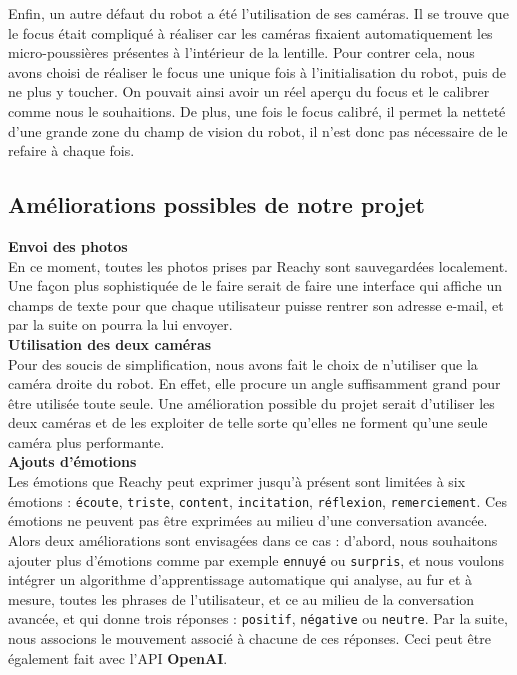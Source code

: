 \documentclass[a4paper,french]{article}
\begin{document}
Enfin, un autre défaut du robot a été l'utilisation de ses caméras. Il se trouve que le focus était compliqué à réaliser car les caméras fixaient automatiquement les micro-poussières présentes à l'intérieur de la lentille. Pour contrer cela, nous avons choisi de réaliser le focus une unique fois à l'initialisation du robot, puis de ne plus y toucher. On pouvait ainsi avoir un réel aperçu du focus et le calibrer comme nous le souhaitions. De plus, une fois le focus calibré, il permet la netteté d'une grande zone du champ de vision du robot, il n'est donc pas nécessaire de le refaire à chaque fois.

\subsection{Améliorations possibles de notre projet}
\textbf{Envoi des photos} \\ 

En ce moment, toutes les photos prises par Reachy sont sauvegardées localement. Une façon plus sophistiquée de le faire serait de faire une interface qui affiche un champs de texte pour que chaque utilisateur puisse rentrer son adresse e-mail, et par la suite on pourra la lui envoyer. \\

\textbf{Utilisation des deux caméras} \\

Pour des soucis de simplification, nous avons fait le choix de n'utiliser que la caméra droite du robot. En effet, elle procure un angle suffisamment grand pour être utilisée toute seule. Une amélioration possible du projet serait d'utiliser les deux caméras et de les exploiter de telle sorte qu'elles ne forment qu'une seule caméra plus performante.\\

\textbf{Ajouts d'émotions} \\ 

Les émotions que Reachy peut exprimer jusqu'à présent sont limitées à six émotions : \texttt{écoute}, \texttt{triste}, \texttt{content}, \texttt{incitation}, \texttt{réflexion}, \texttt{remerciement}. Ces émotions ne peuvent pas être exprimées au milieu d'une conversation avancée. Alors deux améliorations sont envisagées dans ce cas : d'abord, nous souhaitons ajouter plus d'émotions comme par exemple \texttt{ennuyé} ou \texttt{surpris}, et nous voulons intégrer un algorithme d'apprentissage automatique qui analyse, au fur et à mesure, toutes les phrases de l'utilisateur, et ce au milieu de la conversation avancée, et qui donne trois réponses : \texttt{positif}, \texttt{négative} ou \texttt{neutre}. Par la suite, nous associons le mouvement associé à chacune de ces réponses. Ceci peut être également fait avec l'API \textbf{OpenAI}.\\
\end{document}
